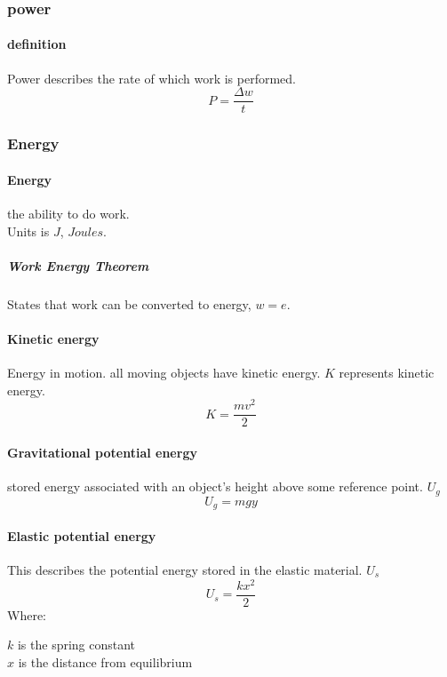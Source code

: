 \documentclass{article} %
\begin{document}
        \subsubsection{power}
            \paragraph{definition}
                Power describes the rate of which work is performed.
                \begin{equation} P=\dfrac{\Delta w}{t} \end{equation}
        \subsubsection{Energy}
            \paragraph{Energy}
                the ability to do work.\\ Units is $J$, $Joules$.
                \subparagraph{Work Energy Theorem}
                    States that work can be converted to energy, $w=e$.
            \paragraph{Kinetic energy}
                Energy in motion. all moving objects have kinetic energy. $K$ represents kinetic energy.
                $$K=\frac{mv^2}{2}$$ 
            \paragraph{Gravitational potential energy}%
            \label{par:Gravitational potential energy}
                stored energy associated with an object's height above some reference point. $U_g$
                \begin{equation}
                    U_g=mgy
                \end{equation}
            \paragraph{Elastic potential energy}
                This describes the potential energy stored in the elastic material. $U_s$
                \begin{equation}
                    U_s=\frac{kx^2}{2}
                \end{equation}
                Where:\begin{center} $k$ is the spring constant\\$x$ is the distance from equilibrium \end{center}
\end{document}
